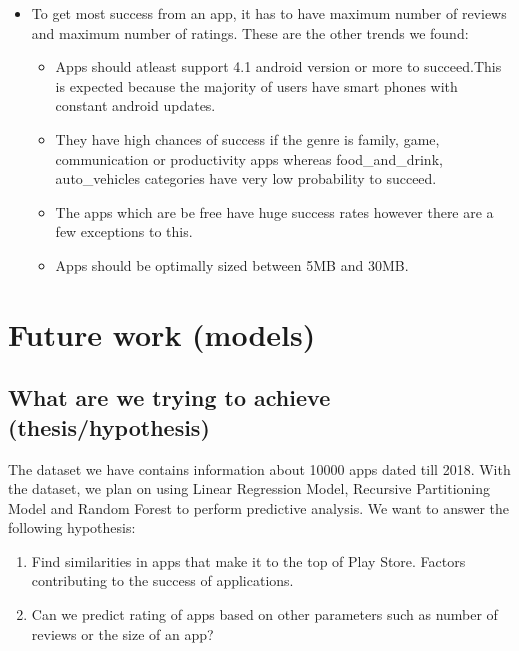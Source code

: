\documentclass[
]{article}
\providecommand{\tightlist}{%
  \setlength{\itemsep}{0pt}\setlength{\parskip}{0pt}}
\begin{document}
\begin{itemize}
\tightlist
\item
  To get most success from an app, it has to have maximum number of
  reviews and maximum number of ratings. These are the other trends we
  found:

  \begin{itemize}
  \tightlist
  \item
    Apps should atleast support 4.1 android version or more to
    succeed.This is expected because the majority of users have smart
    phones with constant android updates.\\
  \item
    They have high chances of success if the genre is family, game,
    communication or productivity apps whereas food\_and\_drink,
    auto\_vehicles categories have very low probability to succeed.\\
  \item
    The apps which are be free have huge success rates however there are
    a few exceptions to this.\\
  \item
    Apps should be optimally sized between 5MB and 30MB.
  \end{itemize}
\end{itemize}

\hypertarget{future-work-models}{%
\section{Future work (models)}\label{future-work-models}}

\hypertarget{what-are-we-trying-to-achieve-thesishypothesis}{%
\subsection{What are we trying to achieve
(thesis/hypothesis)}\label{what-are-we-trying-to-achieve-thesishypothesis}}

The dataset we have contains information about 10000 apps dated till
2018. With the dataset, we plan on using Linear Regression Model,
Recursive Partitioning Model and Random Forest to perform predictive
analysis. We want to answer the following hypothesis:

\begin{enumerate}
\def\labelenumi{\arabic{enumi})}
\tightlist
\item
  Find similarities in apps that make it to the top of Play Store.
  Factors contributing to the success of applications.
\item
  Can we predict rating of apps based on other parameters such as number
  of reviews or the size of an app?
\end{enumerate}
\end{document}
